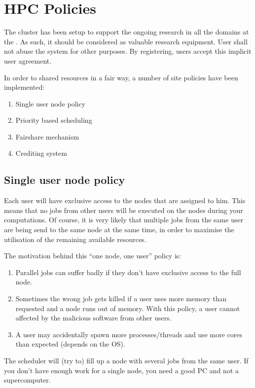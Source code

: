 \chapter{HPC Policies}
\label{ch:hpc-policies}

The cluster has been setup to support the ongoing research in all the domains
at the \university.  As such, it should be considered as
valuable research equipment.  User shall not abuse the system for other purposes. By
registering, users accept this implicit user agreement.

In order to shared resources in a fair way, a number of site policies have been
implemented:

\begin{enumerate}
\item  Single user node policy
\item  Priority based scheduling
\item  Fairshare mechanism
\item  Crediting system
\end{enumerate}


\section{Single user node policy}

Each user will have exclusive access to the nodes that are assigned to him.
This means that no jobs from other users will be executed on the nodes during
your computations.  Of course, it is very likely that multiple jobs from the
same user are being send to the same node at the same time, in order to
maximise the utilisation of the remaining available resources.

The motivation behind this ``one node, one user'' policy is:

\begin{enumerate}
\item  Parallel jobs can suffer badly if they don't have exclusive access to the full node.
\item  Sometimes the wrong job gets killed if a user uses more memory than requested and a node runs out of memory.  With this policy, a user cannot affected by the malicious software from other users.
\item  A user may accidentally spawn more processes/threads and use more cores than expected (depends on the OS).
\end{enumerate}

The scheduler will (try to) fill up a node with several jobs from the same
user. If you don't have enough work for a single node, you need a good PC and
not a supercomputer.


